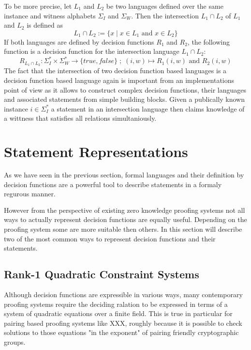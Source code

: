 To be more precise, let $L_1$ and $L_2$ be two languages defined over the same instance and witness alphabets $\Sigma_I$ and $\Sigma_W$. Then the intersection $L_1 \cap L_2$ of $L_1$ and $L_2$ is defined as
\begin{equation}
L_1 \cap L_2 := \{x\;|\; x\in L_1 \text{ and } x\in L_2\}
\end{equation} 
If both languages are defined by decision functions $R_1$ and $R_2$, the following function is a decision function for the intersection language $L_1 \cap L_2$:
\begin{equation}
R_{L_1 \cap L_2}: \Sigma_I^* \times \Sigma_W^* \to \{true, false\}\;;\;
(i,w) \mapsto R_1(i,w) \text{ and } R_2(i,w)
\end{equation}
The fact that the intersection of two decision function based languages is a decision function based language again is important from an implementations point of view as it allows to construct complex decision functions, their languages and associated statements from simple building blocks. Given a publically known instance $i\in \Sigma_I^*$ a statement in an intersection language then claims knowledge of a wittness that satisfies all relations simultaniously. 

\section{Statement Representations} 
As we have seen in the previous section, formal languages and their definition by decision functions are a powerful tool to describe statements in a formaly regurous manner. 

However from the perspective of existing zero knowledge proofing systems not all ways to actually represent decision functions are equally useful. Depending on the proofing system some are more suitable then others. In this section will describe two of the most common ways to represent decision functions and their statements.
\subsection{Rank-1 Quadratic Constraint Systems}
Although decision functions are expressible in various ways, many contemporary proofing systems require the deciding ralation to be expressed in terms of a system of quadratic equations over a finite field. This is true in particular for pairing based proofing systems like XXX, roughly because it is possible to check solutions to those equations "in the exponent" of pairing friendly cryptographic groups.

